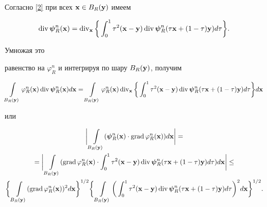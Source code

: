 \begin{pf}
Согласно \eqref{2} при всех $\bold{x}\in B_R(\bold{y})$ имеем


$$


\Div\boldsymbol{\psi}_R^n(\bold{x})=\Div_{\bold{x}}\bigg\{\int_0^1


\tau^2(\bold{x}-\bold{y})


\Div\boldsymbol{\psi}_R^n(\tau\bold{x}+(1-\tau)\bold{y})d\tau\bigg\}.


$$





Умножая это


равенство на $\varphi_R^n$ и интегрируя по шару $B_R(\bold{y})$, получим


$$


\int\limits_{B_R(\bold{y})}\varphi_R^n(\bold{x})\Div\boldsymbol{\psi}_R^n


(\bold{x})d\bold{x}=


\int\limits_{B_R(\bold{y})}\varphi_R^n(\bold{x})


\Div_{\bold{x}}\bigg\{\int_0^1\tau^2(\bold{x}-\bold{y})\Div\boldsymbol{\psi}_R^n


(\tau\bold{x}+(1-\tau)\bold{y})d\tau\bigg\}d\bold{x}


$$


или


\begin{gather*}


\bigg|\int\limits_{B_R(\bold{y})}(\boldsymbol{\psi}_R^n(\bold{x})\cdot\Grad


\varphi_R^n(\bold{x}))d\bold{x}\bigg|=\\


%


=\bigg|\int\limits_{B_R(\bold{y})}(\Grad


\varphi_R^n(\bold{x})\cdot\int_0^1\tau^2(\bold{x}-\bold{y})\Div\boldsymbol{\psi}_R^n


(\tau\bold{x}+(1-\tau)\bold{y})d\tau)d\bold{x}\bigg|\leq\\


%


\bigg\{\int\limits_{B_R(\bold{y})}(\Grad\varphi_R^n(\bold{x}))^2d\bold


{x}\bigg\}^{1/2}\bigg\{\int\limits_{B_R(\bold{y})}\bigg(\int_0^1\tau^2


(\bold{x}-\bold{y})\Div\boldsymbol{\psi}_R^n


(\tau\bold{x}+(1-\tau)\bold{y})d\tau\bigg)^2d\bold{x}\bigg\}^{1/2}.


\end{gather*}



\end{pf}
